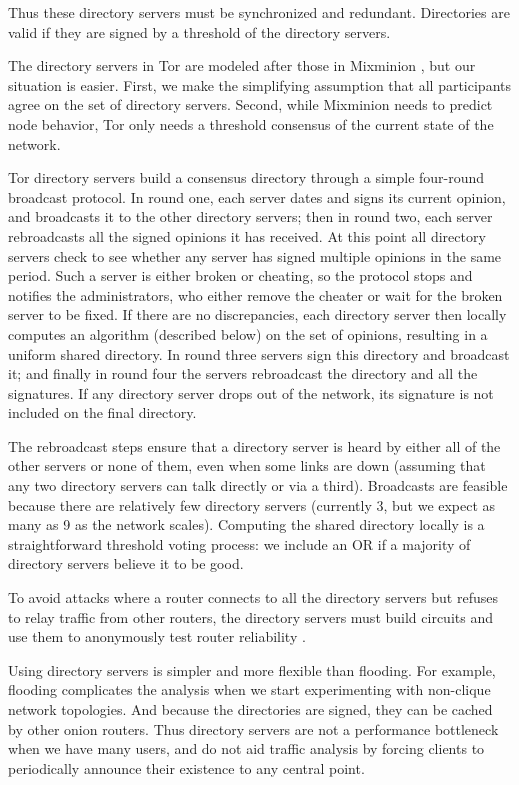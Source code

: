 \documentclass[times,10pt,twocolumn]{article}
\begin{document}
Thus these directory servers must be synchronized and redundant.
Directories are valid if they are signed by a threshold of the directory
servers.

The directory servers in Tor are modeled after those in Mixminion
\cite{minion-design}, but our situation is easier. First, we make the
simplifying assumption that all participants agree on the set of
directory servers. Second, while Mixminion needs to predict node
behavior, Tor only needs a threshold consensus of the current
state of the network.

Tor directory servers build a consensus directory through a simple
four-round broadcast protocol.  In round one, each server dates and
signs its current opinion, and broadcasts it to the other directory
servers; then in round two, each server rebroadcasts all the signed
opinions it has received.  At this point all directory servers check
to see whether any server has signed multiple opinions in the same
period. Such a server is either broken or cheating, so the protocol
stops and notifies the administrators, who either remove the cheater
or wait for the broken server to be fixed.  If there are no
discrepancies, each directory server then locally computes an algorithm
(described below)
on the set of opinions, resulting in a uniform shared directory. In
round three servers sign this directory and broadcast it; and finally
in round four the servers rebroadcast the directory and all the
signatures.  If any directory server drops out of the network, its
signature is not included on the final directory.

The rebroadcast steps ensure that a directory server is heard by
either all of the other servers or none of them, even when some links
are down (assuming that any two directory servers can talk directly or
via a third). Broadcasts are feasible because there are relatively few
directory servers (currently 3, but we expect as many as 9 as the network
scales). Computing the shared directory locally is a straightforward
threshold voting process: we include an OR if a majority of directory
servers believe it to be good.

To avoid attacks where a router connects to all the directory servers
but refuses to relay traffic from other routers, the directory servers
must build circuits and use them to anonymously test router reliability
\cite{mix-acc}.

Using directory servers is simpler and more flexible than flooding.
For example, flooding complicates the analysis when we
start experimenting with non-clique network topologies. And because
the directories are signed, they can be cached by other onion routers.
Thus directory servers are not a performance
bottleneck when we have many users, and do not aid traffic analysis by
forcing clients to periodically announce their existence to any
central point.
\end{document}
